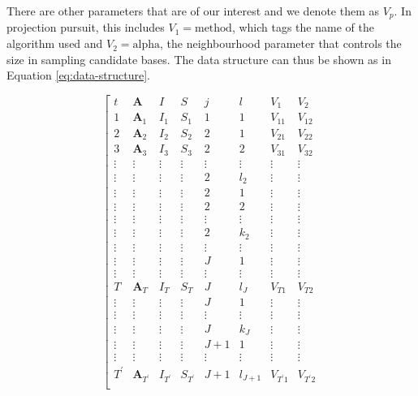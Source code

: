 \documentclass[12pt]{article}
\begin{document}
There are other parameters that are of our interest and we denote them
as \emph{\(V_{p}\)}. In projection pursuit, this includes
\(V_1 = \text{method}\), which tags the name of the algorithm used and
\(V_2 = \text{alpha}\), the neighbourhood parameter that controls the
size in sampling candidate bases. The data structure can thus be shown
as in Equation \ref{eq:data-structure}.

\begin{equation}
\left[
\begin{array}{c|ccc|cc|cc}
t & \mathbf{A} & I & S & j &  l  & V_{1} & V_{2}\\
\hline
1 & \mathbf{A}_1 & I_1 & S_1 & 1 & 1 & V_{11} & V_{12}\\
\hline
2 & \mathbf{A}_2 & I_2 & S_2 & 2 & 1  & V_{21}  & V_{22}\\
3 & \mathbf{A}_3 & I_3 & S_3 & 2 & 2  & V_{31}  & V_{32}\\
\vdots & \vdots &\vdots &\vdots  &\vdots & \vdots &\vdots  &\vdots\\
\vdots & \vdots & \vdots &\vdots & 2 & l_2 & \vdots  & \vdots\\
\hline
\vdots &\vdots & \vdots &\vdots & 2  & 1& \vdots & \vdots\\
\vdots &\vdots &\vdots &\vdots & 2 & 2& \vdots &  \vdots\\
\vdots &\vdots &\vdots &\vdots &\vdots & \vdots & \vdots  &\vdots \\
\vdots &\vdots &\vdots &\vdots & 2 & k_2 &\vdots  & \vdots\\
\hline
\vdots &\vdots &\vdots &\vdots &\vdots & \vdots &\vdots &\vdots \\
\hline
\vdots & \vdots & \vdots &\vdots  & J &  1 & \vdots & \vdots \\
\vdots &\vdots &\vdots &\vdots &\vdots & \vdots &\vdots &\vdots \\
T & \mathbf{A}_T & I_T &S_T  & J &  l_{J} & V_{T1}& V_{T2}\\
\hline
\vdots &\vdots & \vdots &\vdots & J  & 1& \vdots & \vdots\\
\vdots &\vdots &\vdots &\vdots &\vdots & \vdots & \vdots  &\vdots \\
\vdots &\vdots &\vdots &\vdots & J & k_J &\vdots  & \vdots\\
\hline
\vdots& \vdots & \vdots & \vdots & J+1 & 1 & \vdots& \vdots\\
\vdots &\vdots &\vdots &\vdots &\vdots & \vdots &\vdots &\vdots \\
T^\prime & \mathbf{A}_{T^\prime} & I_{T^\prime} &S_{T^\prime}  & J+1 &  l_{J+1} & V_{T^\prime 1}& V_{T^\prime 2}\\

\end{array}
\end{equation}
\end{document}
